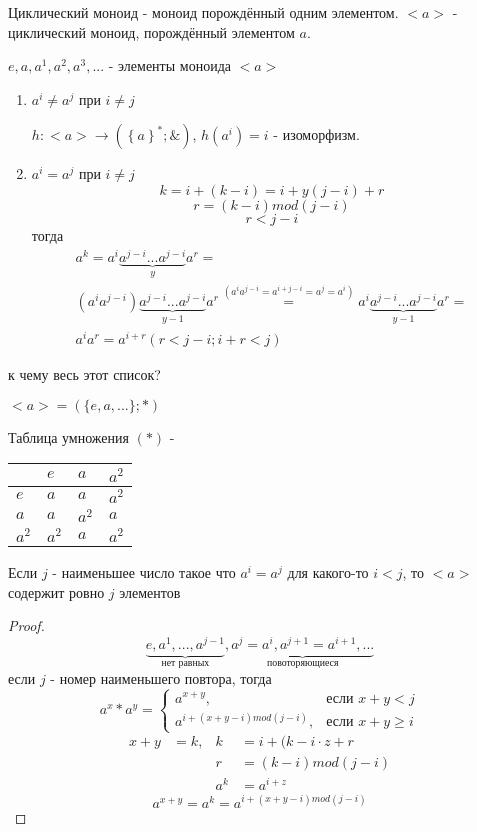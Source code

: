 \documentclass[../main/document.tex]{subfiles}
\begin{document}
\begin{dfn}
Циклический моноид - моноид порождённый одним элементом. $<a>$ - циклический моноид, порождённый элементом $a$. 

$e,a,a^1,a^2,a^3,...$ - элементы моноида $<a>$

\begin{enumerate}
\item $a^i\neq a^j$ при $i\neq j$

$h:<a>\rightarrow ({\left\{a\right\}}^*;\&)$, $h(a^i)=i$ - изоморфизм.
\item $a^i=a^j$ при $i\neq j$
$$k=i+(k-i)=i+y(j-i)+r$$
$$r=(k-i)mod(j-i)$$
$$r<j-i$$
тогда
\begin{multline*}
a^k=a^i\underbrace{a^{j-i}...a^{j-i}}_{y}a^r=\\
(a^ia^{j-i})\underbrace{a^{j-i}...a^{j-i}}_{y-1}a^r\stackrel{(a^ia^{j-i}=a^{i+j-i}=a^j=a^i)}{=}a^i\underbrace{a^{j-i}...a^{j-i}}_{y-1}a^r=\\
a^ia^r=a^{i+r} (r<j-i; i+r<j)
\end{multline*}
\end{enumerate}
к чему весь этот список?
\end{dfn}

\begin{exm} \label{cyclical-exm}
$<a>=(\{e,a,...\};*)$

Таблица умножения $(*)$ -
\begin{table}[h]
\centering
\renewcommand*{\arraystretch}{1.4}
\begin{tabular}{|l|l|l|l|}
\hline
  & $e$ & $a$ & $a^2$ \\ \hline
$e$ & $a$ & $a$ & $a^2$ \\ \hline
$a$ & $a$ & $a^2$ & $a$ \\ \hline
$a^2$ & $a^2$ & $a$ & $a^2$ \\
\hline
\end{tabular}
\end{table}
\end{exm}
\begin{thm}
Если $j$ - наименьшее число такое что $a^i=a^j$ для какого-то $i<j$, то $<a>$ содержит ровно $j$ элементов
\begin{proof}
$$\underbrace{e,a^1,...,a^{j-1}}_\text{нет равных},\underbrace{a^j=a^i,a^{j+1}=a^{i+1},...}_\text{повоторяющиеся}$$
если $j$ - номер наименьшего повтора, тогда
$$a^x*a^y=
\begin{cases}
	a^{x+y},& \text{если } x+y<j\\
	a^{i+(x+y-i)mod(j-i)},& \text{если } x+y\geq i
\end{cases}
$$
\begin{align*}
x+y&=k, & k&=i+(k-i\cdot z+r\\
& & r&=(k-i)mod(j-i)\\
& & a^k&=a^{i+z}
\end{align*}
$$a^{x+y}=a^k=a^{i+(x+y-i)mod(j-i)}$$

\end{proof}
\end{thm}
\end{document}
